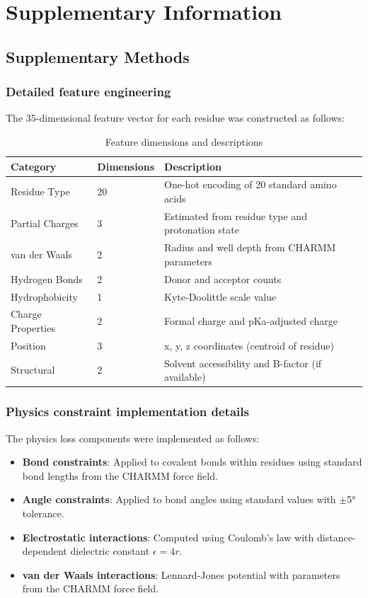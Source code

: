 \section*{Supplementary Information}

\subsection*{Supplementary Methods}

\subsubsection*{Detailed feature engineering}
The 35-dimensional feature vector for each residue was constructed as follows:

\begin{table}[H]
\centering
\caption{Feature dimensions and descriptions}
\begin{tabular}{lll}
\toprule
\textbf{Category} & \textbf{Dimensions} & \textbf{Description} \\
\midrule
Residue Type & 20 & One-hot encoding of 20 standard amino acids \\
Partial Charges & 3 & Estimated from residue type and protonation state \\
van der Waals & 2 & Radius and well depth from CHARMM parameters \\
Hydrogen Bonds & 2 & Donor and acceptor counts \\
Hydrophobicity & 1 & Kyte-Doolittle scale value \\
Charge Properties & 2 & Formal charge and pKa-adjusted charge \\
Position & 3 & x, y, z coordinates (centroid of residue) \\
Structural & 2 & Solvent accessibility and B-factor (if available) \\
\bottomrule
\end{tabular}
\end{table}

\subsubsection*{Physics constraint implementation details}
The physics loss components were implemented as follows:

\begin{itemize}
    \item \textbf{Bond constraints}: Applied to covalent bonds within residues using standard bond lengths from the CHARMM force field.
    \item \textbf{Angle constraints}: Applied to bond angles using standard values with $\pm$5° tolerance.
    \item \textbf{Electrostatic interactions}: Computed using Coulomb's law with distance-dependent dielectric constant $\epsilon = 4r$.
    \item \textbf{van der Waals interactions}: Lennard-Jones potential with parameters from the CHARMM force field.
\end{itemize}

